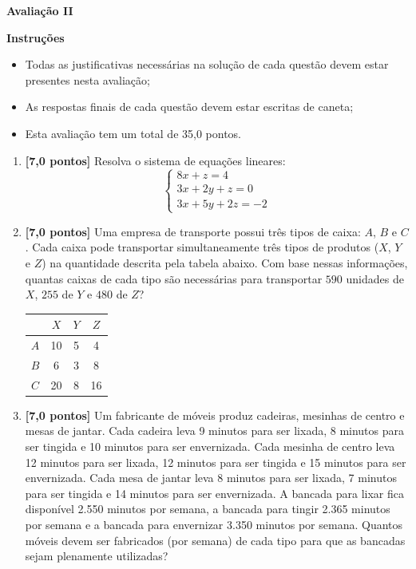 \documentclass[12pt,a4paper]{article}
\begin{document}
\begin{center}
 \textbf{Avaliação II}
\end{center}

\textbf{Instruções}
\begin{itemize}
 \item Todas as justificativas necessárias na solução de cada questão devem estar presentes nesta avaliação;
 \item As respostas finais de cada questão devem estar escritas de caneta;
 \item Esta avaliação tem um total de 35,0 pontos.
\end{itemize}

\begin{enumerate}
  \item \textbf{[7,0 pontos]} Resolva o sistema de equações lineares:
    $$\begin{cases}
      8x +  z  =  4\\
      3x  +  2y  +  z  =  0\\
      3x  +  5y  +  2z  =  -2
    \end{cases}$$

  \item \textbf{[7,0 pontos]} Uma empresa de transporte possui três tipos de caixa:
  $A$, $B$ e $C$. Cada caixa pode transportar simultaneamente três tipos de produtos
  ($X$, $Y$ e $Z$) na quantidade descrita pela tabela abaixo. Com base nessas
  informações, quantas caixas de cada tipo são necessárias para transportar $590$ unidades
  de $X$, $255$ de $Y$ e $480$ de $Z$?
  
    \begin{table}[H]
      \centering
      \begin{tabular}{|c|c|c|c|}
        \cline{2-4} 
        \multicolumn{1}{c|}{} & $X$ & $Y$ & $Z$\\
        \hline 
        $A$ & 10 & 5 & 4\\
        \hline 
        $B$ & 6 & 3 & 8\\
        \hline 
        $C$ & 20 & 8 & 16\\
        \hline 
      \end{tabular}
    \end{table}

  \item \textbf{[7,0 pontos]} Um fabricante de móveis produz cadeiras,
    mesinhas de centro e mesas de jantar. Cada cadeira leva 9 minutos para
    ser lixada, 8 minutos para ser tingida e 10 minutos para ser envernizada.
    Cada mesinha de centro leva 12 minutos para ser lixada, 12 minutos para
    ser tingida e 15 minutos para ser envernizada. Cada mesa de jantar leva
    8 minutos para ser lixada, 7 minutos para ser tingida e 14 minutos para
    ser envernizada. A bancada para lixar fica disponível 2.550 minutos por
    semana, a bancada para tingir 2.365 minutos por semana e a bancada para
    envernizar 3.350 minutos por semana. Quantos móveis devem ser fabricados
    (por semana) de cada tipo para que as bancadas sejam plenamente utilizadas?
    

\end{enumerate}
\end{document}
